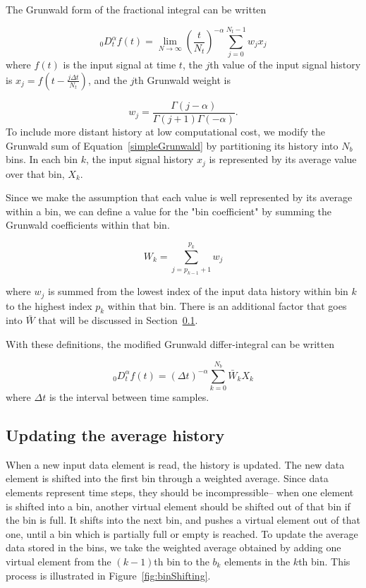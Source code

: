 The Grunwald form of the fractional integral can be written

\begin{equation}
_0D^\alpha_tf(t) = \displaystyle \lim_{N\to\infty} \left(\frac{t}{N_t}\right)^{-\alpha}
\displaystyle\sum\limits_{j=0}^{N_t-1} w_{j}x_j
\label{simpleGrunwald}
\end{equation}
where $f(t)$ is the input signal at time $t$, the $j$th value of the
input signal history is $x_j=f\left(t-\frac{j\Delta t}{N_t}\right)$, and the
$j$th Grunwald weight is

\begin{equation}
w_{j} = \frac{\Gamma(j-\alpha)}{\Gamma(j+1)\Gamma(-\alpha)}.
\label{wj}
\end{equation}
To include more distant history at low computational cost, we modify
the Grunwald sum of Equation~\ref{simpleGrunwald} by partitioning its
history into $N_b$ bins. In each bin $k$, the input signal history
$x_j$ is represented by its average value over that bin, $X_k$.

Since we make the assumption that each value is well represented by
its average within a bin, we can define a value for the "bin
coefficient" by summing the Grunwald coefficients within that bin.

\begin{equation}
W_k = \displaystyle\sum\limits_{j=p_{k-1}+1}^{p_k} w_j
\label{eqn:sumWk}
\end{equation}

\noindent where $w_j$ is summed from the lowest index of the input data history within bin $k$ to the highest index $p_k$ within that bin. There is an additional factor that goes into $\bar{W}$ that will be discussed in Section~\ref{sec:shifting}. 

With these definitions, the modified Grunwald differ-integral can be written

\begin{equation}
_0D^\alpha_t f(t) = \displaystyle(\Delta t)^{-\alpha}\sum\limits_{k=0}^{N_b}\bar{W}_kX_k
\label{avgSimpleGrunwald}
\end{equation}
where $\Delta t$ is the interval between time samples.



\subsection{Updating the average history}
\label{sec:shifting}

When a new input data element is read, the history is updated. The new data element is shifted into the first bin through a weighted average. Since data elements represent time steps, they should be incompressible-- when one element is shifted into a bin, another virtual element should be shifted out of that bin if the bin is full. It shifts into the next bin, and pushes a virtual element out of that one, until a bin which is partially full or empty is reached. To update the average data stored in the bins, we take the weighted average obtained by adding one virtual element from the $(k-1)$th bin to the $b_k$ elements in the $k$th bin. This process is illustrated in Figure~\ref{fig:binShifting}.

